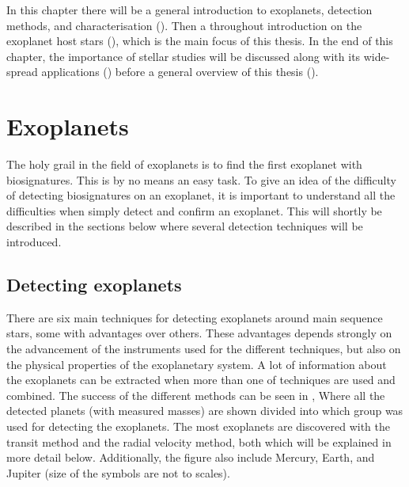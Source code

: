 In this chapter there will be a general introduction to exoplanets, detection methods, and
characterisation (). Then a throughout introduction on the exoplanet host stars
(), which is the main focus of this thesis. In the end of this chapter,
the importance of stellar studies will be discussed along with its wide-spread applications
() before a general overview of this thesis ().



\section{Exoplanets}
\label{sec:exoplanets}

The holy grail in the field of exoplanets is to find the first exoplanet with biosignatures. This is
by no means an easy task. To give an idea of the difficulty of detecting biosignatures on an
exoplanet, it is important to understand all the difficulties when simply detect and confirm an
exoplanet. This will shortly be described in the sections below where several detection techniques
will be introduced.

\subsection{Detecting exoplanets}
\label{sec:detecting_exoplanets}

There are six main techniques for detecting exoplanets around main sequence stars, some with
advantages over others. These advantages depends strongly on the advancement of the instruments used
for the different techniques, but also on the physical properties of the exoplanetary system. A lot
of information about the exoplanets can be extracted when more than one of techniques are used and
combined. The success of the different methods can be seen in , Where all
the detected planets (with measured masses) are shown divided into which group was used for
detecting the exoplanets. The most exoplanets are discovered with the transit method and the radial
velocity method, both which will be explained in more detail below. Additionally, the figure also
include Mercury, Earth, and Jupiter (size of the symbols are not to scales).


